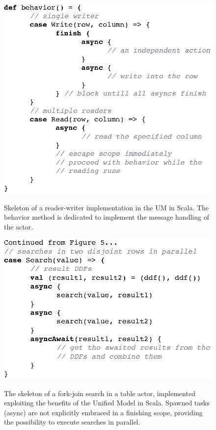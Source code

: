 \documentclass[11pt, journal]{IEEEtran}
\begin{document}
\begin{figure}[!htbp]
\centering
\includegraphics[width=\columnwidth]{figures/reader_writer_um-01.eps}
\begin{caption}
	{Skeleton of a reader-writer implementation in the UM in Scala. The behavior method is dedicated to implement the message handling of the actor.} \label{fig:readerwriterum}
\end{caption}
\end{figure}

\begin{figure}[!htbp]
\centering
\includegraphics[width=\columnwidth]{figures/parallelsearchum-02.eps}
\begin{caption}
	{The skeleton of a fork-join search in a table actor, implemented exploiting the benefits of the Unified Model in Scala. Spawned tasks (async) are not explicitly embraced in a finishing scope, providing the possibility to execute searches in parallel.} \label{fig:parallelsearchum}
\end{caption}
\end{figure}
\end{document}
